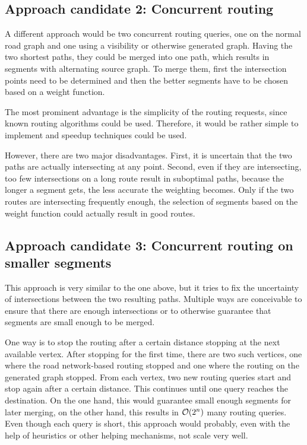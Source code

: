 	\subsection{Approach candidate 2: Concurrent routing}
	
		A different approach would be two concurrent routing queries, one on the normal road graph and one using a visibility or otherwise generated graph.
		Having the two shortest paths, they could be merged into one path, which results in segments with alternating source graph.
		To merge them, first the intersection points need to be determined and then the better segments have to be chosen based on a weight function.
		
		The most prominent advantage is the simplicity of the routing requests, since known routing algorithms could be used.
		Therefore, it would be rather simple to implement and speedup techniques could be used.
		
		However, there are two major disadvantages.
		First, it is uncertain that the two paths are actually intersecting at any point.
		Second, even if they are intersecting, too few intersections on a long route result in suboptimal paths, because the longer a segment gets, the less accurate the weighting becomes.
		Only if the two routes are intersecting frequently enough, the selection of segments based on the weight function could actually result in good routes.
	
	\subsection{Approach candidate 3: Concurrent routing on smaller segments}
	
		This approach is very similar to the one above, but it tries to fix the uncertainty of intersections between the two resulting paths.
		Multiple ways are conceivable to ensure that there are enough intersections or to otherwise guarantee that segments are small enough to be merged.
		
		One way is to stop the routing after a certain distance stopping at the next available vertex.
		After stopping for the first time, there are two such vertices, one where the road network-based routing stopped and one where the routing on the generated graph stopped.
		From each vertex, two new routing queries start and stop again after a certain distance.
		This continues until one query reaches the destination.
		On the one hand, this would guarantee small enough segments for later merging, on the other hand, this results in $\mathcal{O}(2^n)$ many routing queries.
		Even though each query is short, this approach would probably, even with the help of heuristics or other helping mechanisms, not scale very well.
		
